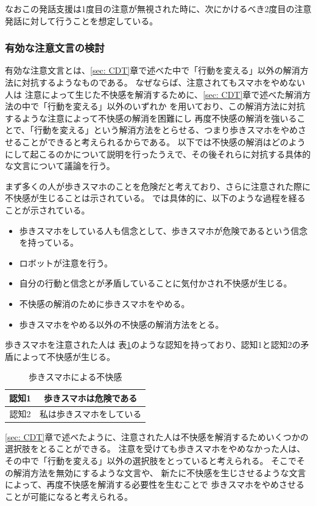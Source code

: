 \documentclass{kuisthesis}
\begin{document}
なおこの発話支援は1度目の注意が無視された時に、次にかけるべき2度目の注意発話に対して行うことを想定している。
\subsubsection{有効な注意文言の検討}
\label{sec: effective}
有効な注意文言とは、\ref{sec: CDT}章で述べた中で「行動を変える」以外の解消方法に対抗するようなものである。
なぜならば、注意されてもスマホをやめない人は
注意によって生じた不快感を解消するために、\ref{sec: CDT}章で述べた解消方法の中で「行動を変える」以外のいずれか
を用いており、この解消方法に対抗するような注意によって不快感の解消を困難にし
再度不快感の解消を強いることで、「行動を変える」という解消方法をとらせる、つまり歩きスマホをやめさせることができると考えられるからである。
以下では不快感の解消はどのようにして起こるのかについて説明を行ったうえで、その後それらに対抗する具体的な文言について議論を行う。

まず多くの人が歩きスマホのことを危険だと考えており、さらに注意された際に不快感が生じることは示されている。
\cite{Schneider2022}では具体的に、以下のような過程を経ることが示されている。
\begin{itemize}
  \item[(1)] 歩きスマホをしている人も信念として、歩きスマホが危険であるという信念を持っている。
  \item[(2)] ロボットが注意を行う。
  \item[(3)] 自分の行動と信念とが矛盾していることに気付かされ不快感が生じる。
  \item[(4)] 不快感の解消のために歩きスマホをやめる。
  \item[(4')]歩きスマホをやめる以外の不快感の解消方法をとる。
  \label{item: dissonance}
\end{itemize}

歩きスマホを注意された人は
表\ref{fig: UsingPhone}のような認知を持っており、認知1と認知2の矛盾によって不快感が生じる。
\begin{table}[h]
  \centering
  \caption{歩きスマホによる不快感}
  \label{fig: UsingPhone}
  \begin{tabular}{c|c}

      認知1 & 歩きスマホは危険である  \\ \hline
      認知2 & 私は歩きスマホをしている \\ 
  \end{tabular}
\end{table}
\ref{sec: CDT}章で述べたように、注意された人は不快感を解消するためいくつかの選択肢をとることができる。
注意を受けても歩きスマホをやめなかった人は、
その中で「行動を変える」以外の選択肢をとっていると考えられる。
そこでその解消方法を無効にするような文言や、
新たに不快感を生じさせるような文言によって、再度不快感を解消する必要性を生むことで
歩きスマホをやめさせることが可能になると考えられる。
\end{document}
